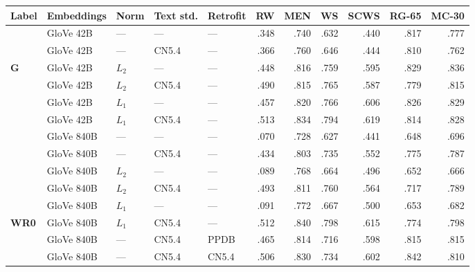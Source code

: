 \documentclass[11pt]{article}
\begin{document}
\begin{table*}[t]
\centering
\begin{tabular}{lllllrrrrrr}
\toprule
Label  &Embeddings   & Norm  & Text std. & Retrofit &       RW & MEN      &        WS &      SCWS &    RG-65 &    MC-30 \\
\midrule
       &GloVe 42B    & ---   & ---       & ---      &     .348 &     .740 &      .632 &      .440 &     .817 &     .777 \\
       &GloVe 42B    & ---   & CN5.4     & ---      &     .366 &     .760 &      .646 &      .444 &     .810 &     .762 \\
\bf G  &GloVe 42B    & $L_2$ & ---       & ---      &     .448 &     .816 &      .759 &      .595 &     .829 &     .836 \\
       &GloVe 42B    & $L_2$ & CN5.4     & ---      &     .490 &     .815 &      .765 &      .587 &     .779 &     .815 \\
       &GloVe 42B    & $L_1$ & ---       & ---      &     .457 &     .820 &      .766 &      .606 &     .826 &     .829 \\
       &GloVe 42B    & $L_1$ & CN5.4     & ---      &     .513 &     .834 &      .794 &      .619 &     .814 &     .828 \\
\midrule
       &GloVe 840B   & ---   & ---       & ---      &     .070 &     .728 &      .627 &      .441 &     .648 &     .696 \\
       &GloVe 840B   & ---   & CN5.4     & ---      &     .434 &     .803 &      .735 &      .552 &     .775 &     .787 \\
       &GloVe 840B   & $L_2$ & ---       & ---      &     .089 &     .768 &      .664 &      .496 &     .652 &     .666 \\
       &GloVe 840B   & $L_2$ & CN5.4     & ---      &     .493 &     .811 &      .760 &      .564 &     .717 &     .789 \\
       &GloVe 840B   & $L_1$ & ---       & ---      &     .091 &     .772 &      .667 &      .500 &     .653 &     .682 \\
\bf WR0&GloVe 840B   & $L_1$ & CN5.4     & ---      &     .512 &     .840 &      .798 &      .615 &     .774 &     .798 \\
\midrule
       &GloVe 840B   & ---   & CN5.4     & PPDB     &     .465 &     .814 &      .716 &      .598 &     .815 &     .815 \\
       &GloVe 840B   & ---   & CN5.4     & CN5.4    &     .506 &     .830 &      .734 &      .602 &     .842 &     .810 \\

\end{tabular}
\end{table*}
\end{document}
